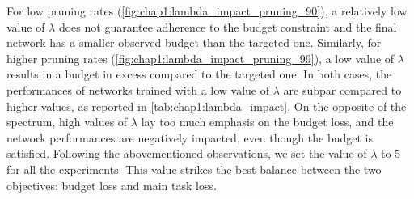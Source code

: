 For low pruning rates (\cref{fig:chap1:lambda_impact_pruning_90}), a relatively
low value of $\lambda$ does not guarantee adherence to the budget constraint and
the final network has a smaller observed budget than the targeted one.
Similarly, for higher pruning rates (\cref{fig:chap1:lambda_impact_pruning_99}),
a low value of $\lambda$ results in a budget in excess compared to the targeted
one. In both cases, the performances of networks trained with a low value of
$\lambda$ are subpar compared to higher values, as reported in
\cref{tab:chap1:lambda_impact}. On the opposite of the spectrum, high values of
$\lambda$ lay too much emphasis on the budget loss, and the network performances
are negatively impacted, even though the budget is satisfied. Following the
abovementioned observations, we set the value of $\lambda$ to 5 for all the
experiments. This value strikes the best balance between the two objectives:
budget loss and main task loss.


